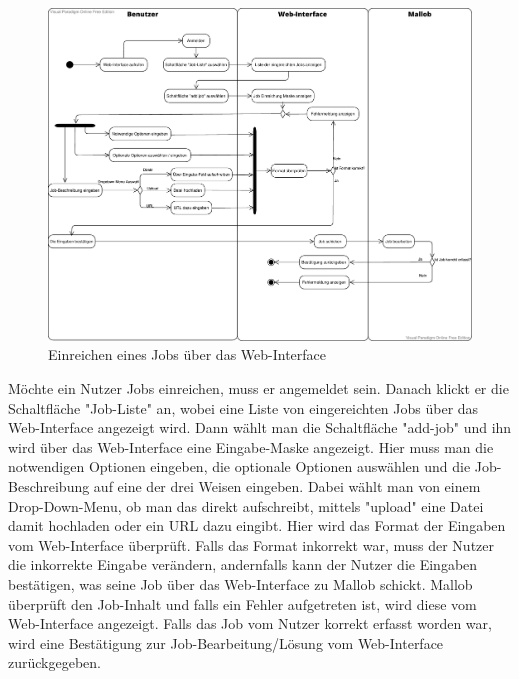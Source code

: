 \begin{figure}[H]
    \centering
    \includegraphics[width=\textwidth]{images-interface/Job_einreichen.pdf}
    \caption{Einreichen eines Jobs über das Web-Interface}
\end{figure}
Möchte ein \gls{Nutzer} Jobs einreichen, muss er angemeldet sein. Danach klickt er die Schaltfläche "Job-Liste" an, wobei eine Liste von eingereichten Jobs über das Web-Interface angezeigt wird. Dann wählt man die Schaltfläche "add-job" und ihn wird über das Web-Interface eine Eingabe-Maske angezeigt. Hier muss man die notwendigen Optionen eingeben, die optionale Optionen auswählen und die Job-Beschreibung auf eine der drei Weisen eingeben. Dabei wählt man von einem Drop-Down-Menu, ob man das direkt aufschreibt, mittels "upload" eine Datei damit hochladen oder ein URL dazu eingibt. Hier wird das Format der Eingaben vom Web-Interface überprüft. Falls das Format inkorrekt war, muss der \gls{Nutzer} die inkorrekte Eingabe verändern, andernfalls kann der \gls{Nutzer} die Eingaben bestätigen, was seine Job über das Web-Interface zu Mallob schickt. Mallob überprüft den Job-Inhalt und falls ein Fehler aufgetreten ist, wird diese vom Web-Interface angezeigt. Falls das Job vom \gls{Nutzer} korrekt erfasst worden war, wird eine Bestätigung zur Job-Bearbeitung/Lösung vom Web-Interface zurückgegeben.

